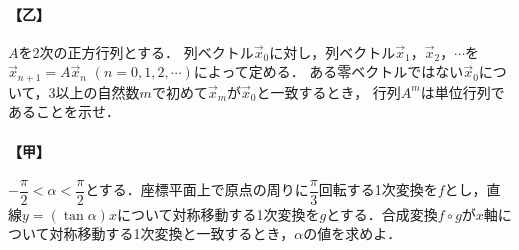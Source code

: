\documentclass[../../main.tex]{subfiles}
\begin{document}
\paragraph{【乙】}
$A$を2次の正方行列とする．
列ベクトル$\vec{x}_0$に対し，列ベクトル$\vec{x}_1$，$\vec{x}_2$，$\cdots$を
$\vec{x}_{n+1}=A\vec{x}_n$ $(n=0,1,2,\cdots)$によって定める．
ある零ベクトルではない$\vec{x}_0$について，3以上の自然数$m$で初めて$\vec{x}_m$が$\vec{x}_0$と一致するとき，
行列$A^m$は単位行列であることを示せ．

\paragraph{【甲】}
$-\dfrac{\pi}{2} < \alpha < \dfrac{\pi}{2}$とする．座標平面上で原点の周りに$\dfrac{\pi}{3}$回転する1次変換を$f$とし，直線$y = (\tan\alpha)x$について対称移動する1次変換を$g$とする．合成変換$f \circ g$が$x$軸について対称移動する1次変換と一致するとき，$\alpha$の値を求めよ．
\end{document}
